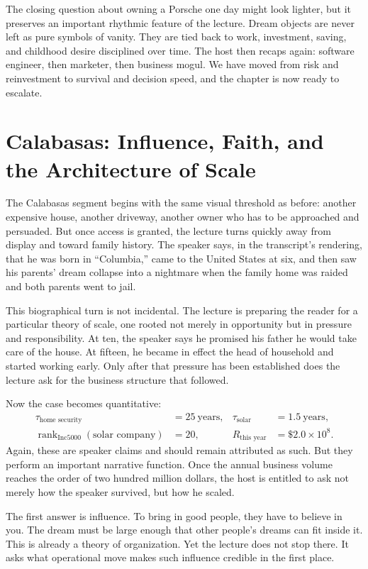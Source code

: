 The closing question about owning a Porsche one day might look lighter, but it preserves an important rhythmic feature of the lecture. Dream objects are never left as pure symbols of vanity. They are tied back to work, investment, saving, and childhood desire disciplined over time. The host then recaps again: software engineer, then marketer, then business mogul. We have moved from risk and reinvestment to survival and decision speed, and the chapter is now ready to escalate.

\section{Calabasas: Influence, Faith, and the Architecture of Scale}

The Calabasas segment begins with the same visual threshold as before: another expensive house, another driveway, another owner who has to be approached and persuaded. But once access is granted, the lecture turns quickly away from display and toward family history. The speaker says, in the transcript's rendering, that he was born in ``Columbia,'' came to the United States at six, and then saw his parents' dream collapse into a nightmare when the family home was raided and both parents went to jail.

This biographical turn is not incidental. The lecture is preparing the reader for a particular theory of scale, one rooted not merely in opportunity but in pressure and responsibility. At ten, the speaker says he promised his father he would take care of the house. At fifteen, he became in effect the head of household and started working early. Only after that pressure has been established does the lecture ask for the business structure that followed.

Now the case becomes quantitative:
\begin{align}
\tau_{\text{home security}} &= 25\ \text{years}, &
\tau_{\text{solar}} &= 1.5\ \text{years},\\
\operatorname{rank}_{\text{Inc5000}}(\text{solar company}) &= 20, &
R_{\text{this year}} &= \$2.0\times 10^8.
\end{align}
Again, these are speaker claims and should remain attributed as such. But they perform an important narrative function. Once the annual business volume reaches the order of two hundred million dollars, the host is entitled to ask not merely how the speaker survived, but how he scaled.

The first answer is influence. To bring in good people, they have to believe in you. The dream must be large enough that other people's dreams can fit inside it. This is already a theory of organization. Yet the lecture does not stop there. It asks what operational move makes such influence credible in the first place.

